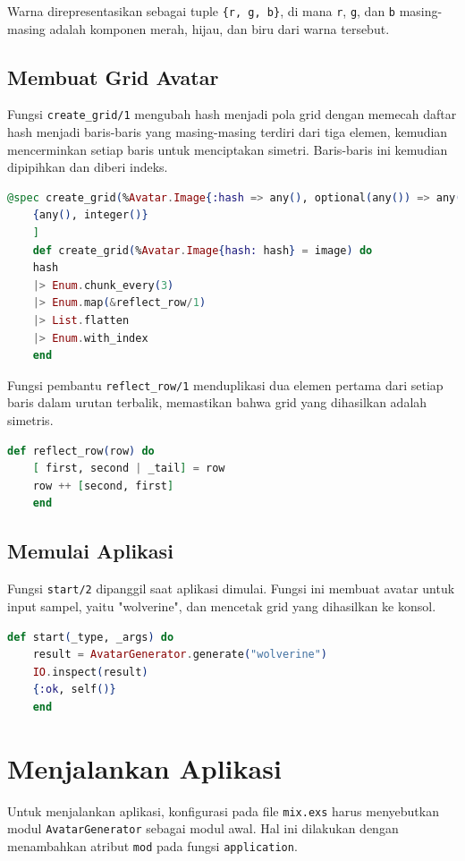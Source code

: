 Warna direpresentasikan sebagai tuple \texttt{\{r, g, b\}}, di mana \texttt{r}, \texttt{g}, dan \texttt{b} masing-masing adalah komponen merah, hijau, dan biru dari warna tersebut.

\subsection{Membuat Grid Avatar}
Fungsi \texttt{create\_grid/1} mengubah hash menjadi pola grid dengan memecah daftar hash menjadi baris-baris yang masing-masing terdiri dari tiga elemen, kemudian mencerminkan setiap baris untuk menciptakan simetri. Baris-baris ini kemudian dipipihkan dan diberi indeks.

\begin{lstlisting}[language=Elixir, caption={Membuat grid avatar}]
	@spec create_grid(%Avatar.Image{:hash => any(), optional(any()) => any()}) :: [
	{any(), integer()}
	]
	def create_grid(%Avatar.Image{hash: hash} = image) do
	hash
	|> Enum.chunk_every(3)
	|> Enum.map(&reflect_row/1)
	|> List.flatten
	|> Enum.with_index
	end
\end{lstlisting}

Fungsi pembantu \texttt{reflect\_row/1} menduplikasi dua elemen pertama dari setiap baris dalam urutan terbalik, memastikan bahwa grid yang dihasilkan adalah simetris.

\begin{lstlisting}[language=Elixir, caption={Mencerminkan baris untuk menciptakan simetri}]
	def reflect_row(row) do
	[ first, second | _tail] = row
	row ++ [second, first]
	end
\end{lstlisting}

\subsection{Memulai Aplikasi}
Fungsi \texttt{start/2} dipanggil saat aplikasi dimulai. Fungsi ini membuat avatar untuk input sampel, yaitu "wolverine", dan mencetak grid yang dihasilkan ke konsol.

\begin{lstlisting}[language=Elixir, caption={Memulai aplikasi dan membuat avatar}]
	def start(_type, _args) do
	result = AvatarGenerator.generate("wolverine")
	IO.inspect(result)
	{:ok, self()}
	end
\end{lstlisting}

\section{Menjalankan Aplikasi}
Untuk menjalankan aplikasi, konfigurasi pada file \texttt{mix.exs} harus menyebutkan modul \texttt{AvatarGenerator} sebagai modul awal. Hal ini dilakukan dengan menambahkan atribut \texttt{mod} pada fungsi \texttt{application}.

